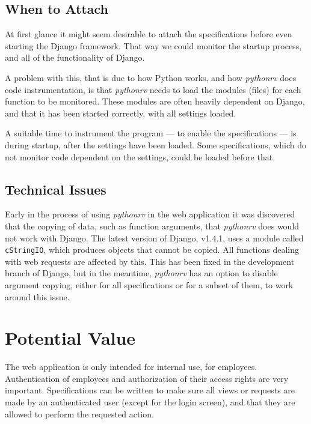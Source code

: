 \subsection{When to Attach}

At first glance it might seem desirable to attach the specifications before
even starting the Django framework. That way we could monitor the startup
process, and all of the functionality of Django.

A problem with this, that is due to how Python works, and how \textit{pythonrv}
does code instrumentation, is that \textit{pythonrv} needs to load the modules
(files) for each function to be monitored. These modules are often heavily
dependent on Django, and that it has been started correctly, with all settings
loaded.

A suitable time to instrument the program --- to enable the specifications ---
is during startup, after the settings have been loaded. Some specifications,
which do not monitor code dependent on the settings, could be loaded before
that.


\subsection{Technical Issues}

Early in the process of using \textit{pythonrv} in the web application it was
discovered that the copying of data, such as function arguments, that
\textit{pythonrv} does would not work with Django. The latest version of
Django, v1.4.1, uses a module called \texttt{cStringIO}, which produces objects
that cannot be copied. All functions dealing with web requests are affected by
this. This has been fixed in the development branch of Django, but in the
meantime, \textit{pythonrv} has an option to disable argument copying, either
for all specifications or for a subset of them, to work around this issue.


\section{Potential Value}

The web application is only intended for internal use, for employees.
Authentication of employees and authorization of their access rights are very
important. Specifications can be written to make sure all views or requests are
made by an authenticated user (except for the login screen), and that they are
allowed to perform the requested action.

